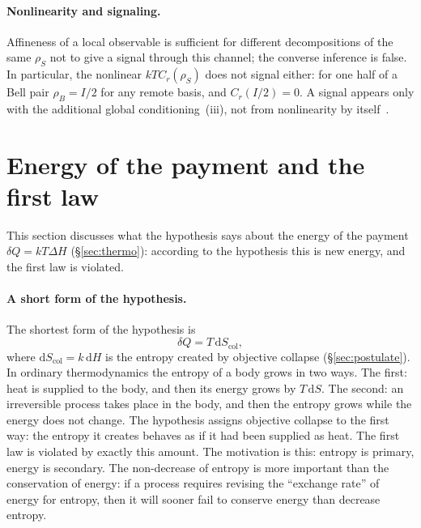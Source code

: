 \documentclass[11pt,a4paper]{article}
\newcommand{\Sref}[1]{\hyperref[#1]{\S\ref{#1}}}
\begin{document}
\paragraph{Nonlinearity and signaling.}
Affineness of a local observable is sufficient for different decompositions of the same $\rho_S$ not to give a signal through this channel; the converse inference is false. In particular, the nonlinear $kT C_r(\rho_S)$ does not signal either: for one half of a Bell pair $\rho_B=I/2$ for any remote basis, and $C_r(I/2)=0$. A signal appears only with the additional global conditioning~(iii), not from nonlinearity by itself~\cite{gisin1989,gisin1990,polchinski1991,hjw1993}.

\section{Energy of the payment and the first law}\label{sec:origin}

This section discusses what the hypothesis says about the energy of the payment $\delta Q = kT\Delta H$ (\Sref{sec:thermo}): according to the hypothesis this is new energy, and the first law is violated.

\paragraph{A short form of the hypothesis.}
The shortest form of the hypothesis is
\begin{equation}
\delta Q = T\,\mathrm{d}S_{\mathrm{col}},
\label{eq:dq_tds}
\end{equation}
where $\mathrm{d}S_{\mathrm{col}}=k\,\mathrm{d}H$ is the entropy created by objective collapse (\Sref{sec:postulate}). In ordinary thermodynamics the entropy of a body grows in two ways. The first: heat is supplied to the body, and then its energy grows by $T\,\mathrm{d}S$. The second: an irreversible process takes place in the body, and then the entropy grows while the energy does not change. The hypothesis assigns objective collapse to the first way: the entropy it creates behaves as if it had been supplied as heat. The first law is violated by exactly this amount. The motivation is this: entropy is primary, energy is secondary. The non-decrease of entropy is more important than the conservation of energy: if a process requires revising the ``exchange rate'' of energy for entropy, then it will sooner fail to conserve energy than decrease entropy.
\end{document}
